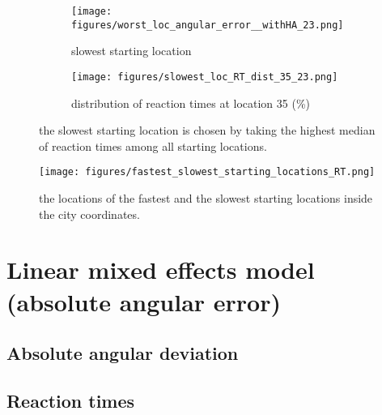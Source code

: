 \begin{figure}[!h]
	\begin{subfigure}[b]{0.48\linewidth}
		\texttt{[image: figures/worst\_loc\_angular\_error\_\_withHA\_23.png]}
		\caption{slowest starting location}
		\label{fig:slowest_loc}
	\end{subfigure}
	\begin{subfigure}[b]{0.48\linewidth}
		\texttt{[image: figures/slowest\_loc\_RT\_dist\_35\_23.png]}
		\caption{distribution of reaction times at location 35 (\%)}
		\label{fig:best_angular_dist_35}
	\end{subfigure}
	
	\caption[Slowest starting location]{the slowest starting location is chosen by taking the highest median of reaction times among all starting locations.}
\end{figure}
\label{fig:slowest_location}

\begin{figure}[h]
	\centering
	\texttt{[image: figures/fastest\_slowest\_starting\_locations\_RT.png]}
	\caption[Locations of fastest and slowest starting locations in city]{the locations of the fastest and the slowest starting locations inside the city coordinates.}
	\label{fig:fastest_slowest_locs}
\end{figure}

\section{Linear mixed effects model (absolute angular error)}

\subsection{Absolute angular deviation}

\subsection{Reaction times}

